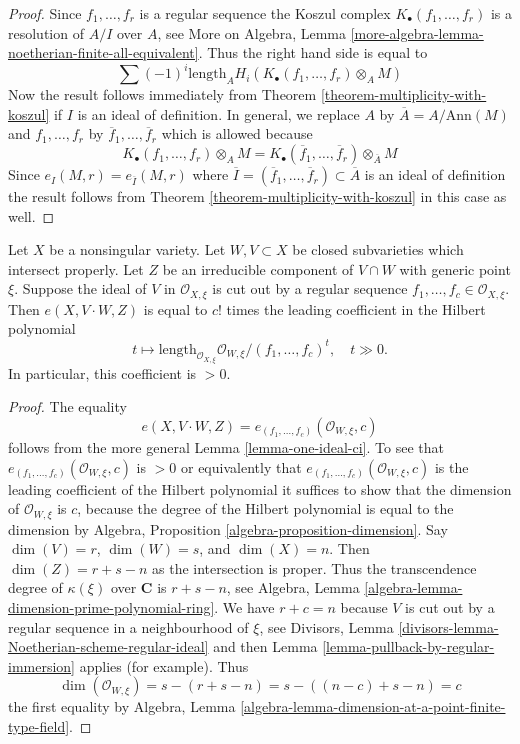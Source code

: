 \begin{proof}
Since $f_1, \ldots, f_r$ is a regular sequence the Koszul complex
$K_\bullet(f_1, \ldots, f_r)$ is a resolution of $A/I$ over $A$, see
More on Algebra, Lemma
\ref{more-algebra-lemma-noetherian-finite-all-equivalent}.
Thus the right hand side is equal to
$$
\sum (-1)^i\text{length}_A H_i(K_\bullet(f_1, \ldots, f_r) \otimes_A M)
$$
Now the result follows immediately from
Theorem \ref{theorem-multiplicity-with-koszul} if $I$ is an ideal
of definition. In general, we replace $A$ by $\overline{A} = A/\text{Ann}(M)$
and $f_1, \ldots, f_r$ by $\overline{f}_1, \ldots, \overline{f}_r$
which is allowed because
$$
K_\bullet(f_1, \ldots, f_r) \otimes_A M =
K_\bullet(\overline{f}_1, \ldots, \overline{f}_r) \otimes_{\overline{A}} M
$$
Since $e_I(M, r) = e_{\overline{I}}(M, r)$ where
$\overline{I} = (\overline{f}_1, \ldots, \overline{f}_r) \subset \overline{A}$
is an ideal of definition the result follows from
Theorem \ref{theorem-multiplicity-with-koszul} in this case as well.
\end{proof}

\begin{lemma}
\label{lemma-multiplicity-with-lci}
Let $X$ be a nonsingular variety. Let $W,V \subset X$ be
closed subvarieties which intersect properly. Let $Z$ be an irreducible
component of $V \cap W$ with generic point $\xi$.
Suppose the ideal of $V$ in $\mathcal{O}_{X, \xi}$ is cut out by
a regular sequence $f_1, \ldots, f_c \in \mathcal{O}_{X, \xi}$.
Then $e(X, V\cdot W, Z)$ is equal to $c!$ times the leading coefficient in
the Hilbert polynomial
$$
t \mapsto \text{length}_{\mathcal{O}_{X, \xi}}
\mathcal{O}_{W, \xi}/(f_1, \ldots, f_c)^t,\quad t \gg 0.
$$
In particular, this coefficient is $> 0$.
\end{lemma}

\begin{proof}
The equality
$$
e(X, V\cdot W, Z) = e_{(f_1, \dots, f_c)}(\mathcal{O}_{W, \xi}, c)
$$
follows from the more general Lemma \ref{lemma-one-ideal-ci}.
To see that $e_{(f_1, \dots, f_c)}(\mathcal{O}_{W, \xi}, c)$ is
$> 0$ or equivalently that $e_{(f_1, \dots, f_c)}(\mathcal{O}_{W, \xi}, c)$
is the leading coefficient of the Hilbert polynomial
it suffices to show that the
dimension of $\mathcal{O}_{W, \xi}$ is $c$, because the degree of the
Hilbert polynomial is equal to the dimension by
Algebra, Proposition \ref{algebra-proposition-dimension}.
Say $\dim(V) = r$, $\dim(W) = s$, and $\dim(X) = n$. Then
$\dim(Z) = r + s - n$ as the intersection is proper. Thus
the transcendence degree of $\kappa(\xi)$ over $\mathbf{C}$ is
$r + s - n$, see Algebra, Lemma
\ref{algebra-lemma-dimension-prime-polynomial-ring}.
We have $r + c = n$ because $V$ is cut out by a regular sequence
in a neighbourhood of $\xi$, see
Divisors, Lemma \ref{divisors-lemma-Noetherian-scheme-regular-ideal}
and then Lemma \ref{lemma-pullback-by-regular-immersion}
applies (for example). Thus
$$
\dim(\mathcal{O}_{W, \xi}) = s - (r + s - n) = s - ((n - c) + s - n) = c
$$
the first equality by Algebra, Lemma
\ref{algebra-lemma-dimension-at-a-point-finite-type-field}.
\end{proof}

